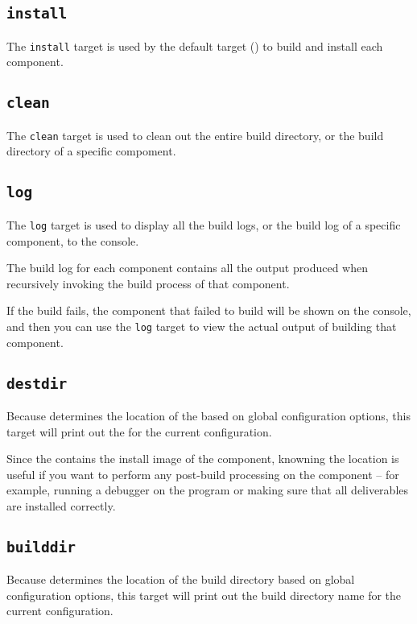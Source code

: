 \subsection{\texttt{install}}

The \texttt{install} target is used by the default target
() to build and install each component.

\subsection{\texttt{clean}}

The \texttt{clean} target is used to clean out the entire build
directory, or the build directory of a specific compoment.

\subsection{\texttt{log}}

The \texttt{log} target is used to display all the build logs, or the
build log of a specific component, to the console.

The build log for each component contains all the output produced when
recursively invoking the build process of that component.

If the build fails, the component that failed to build will be shown
on the console, and then you can use the \texttt{log} target to view
the actual output of building that component.

\subsection{\texttt{destdir}}

Because \lmsbw determines the location of the \destdir based on global
configuration options, this target will print out the \destdir for the
current configuration.

Since the \destdir contains the install image of the component,
knowning the \destdir location is useful if you want to perform any
post-build processing on the component -- for example, running a
debugger on the program or making sure that all deliverables are
installed correctly.

\subsection{\texttt{builddir}}

Because \lmsbw determines the location of the build directory based on
global configuration options, this target will print out the build
directory name for the current configuration.

